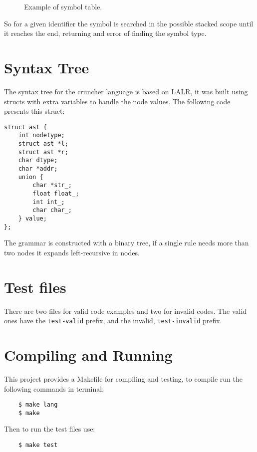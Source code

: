 \documentclass{article}
\begin{document}
\begin{figure}[ht]
\caption{Example of symbol table.}
\end {figure}

So for a given identifier the symbol is searched in the possible stacked scope
until it reaches the end, returning and error of finding the symbol type.

\section{Syntax Tree}%
\label{sec:syntax}
The syntax tree for the cruncher language is based on LALR, it was built using
structs with extra variables to handle the node values. The following code
presents this struct:

\begin{verbatim}
struct ast {
    int nodetype;
    struct ast *l;
    struct ast *r;
    char dtype;
    char *addr;
    union {
        char *str_;
        float float_;
        int int_;
        char char_;
    } value;
};
\end{verbatim}

The grammar is constructed with a binary tree, if a single rule needs more than
two nodes it expands left-recursive in nodes.


\section{Test files}
\label{sec:test}
There are two files for valid code examples and two for invalid codes. The
valid ones have the \texttt{test-valid} prefix, and the invalid,
\texttt{test-invalid} prefix.

\section{Compiling and Running}%
\label{sec:compiling}
This project provides a Makefile for compiling and testing, to compile run the
following commands in terminal:
\begin{verbatim}
    $ make lang
    $ make
\end{verbatim}

Then to run the test files use:
\begin{verbatim}
    $ make test
\end{verbatim}
\end{document}
